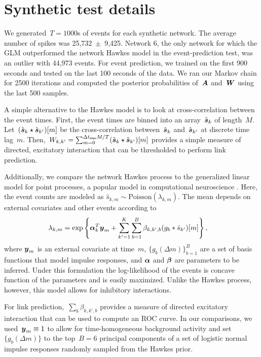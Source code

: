 \section{Synthetic test details}
We generated~${T=1000}$s of events for each synthetic network. The average number of spikes was 25,732~$\pm$~9,425. Network 6, the only network for which the GLM outperformed the network Hawkes model in the event-prediction test,  was an outlier with 44,973 events. For event prediction, we trained on the first 900 seconds and tested on the last 100 seconds of the data. We ran our Markov chain for 2500 iterations and computed the posterior probabilities of~$\boldsymbol{A}$ and~$\boldsymbol{W}$ using the last 500 samples. 

A simple alternative to the Hawkes model is to look at cross-correlation between the event times. First, the event times are binned into an array~$\hat{\boldsymbol{s}}_k$ of length~$M$. Let~${(\hat{\boldsymbol{s}}_k \star \hat{\boldsymbol{s}}_{k'})[m]}$ be the cross-correlation between~$\hat{\boldsymbol{s}}_k$ and~$\hat{\boldsymbol{s}}_{k'}$ at discrete time lag~$m$. Then,~${W_{k,k'}=\sum_{m=0}^{\Delta t_{\mathsf{max}}M/T}(\hat{\boldsymbol{s}}_k \star \hat{\boldsymbol{s}}_{k'})[m]}$ provides a simple measure of directed, excitatory interaction that can be thresholded to perform link prediction.

Additionally, we compare the network Hawkes process to the generalized linear model for point processes, a popular model in computational neuroscience \cite{Paninski-2004}. Here, the event counts are modeled as ${\hat{s}_{k,m}\sim\text{Poisson}(\lambda_{k,m})}$. The mean depends on external covariates and other events according to
\begin{align*}
  \lambda_{k,m} &= \exp\left\{ \boldsymbol{\alpha}_k^T\boldsymbol{y}_m + \sum_{k'=1}^K\sum_{b=1}^B \beta_{k,k',b} (g_{b}\ast \hat{s}_{k'})[m ]\right\},
\end{align*}
where $\boldsymbol{y}_m$ is an external covariate at time~$m$, $\{g_b(\Delta m)\}_{b=1}^B$ are a set of basis functions that model impulse responses, and $\boldsymbol{\alpha}$ and $\boldsymbol{\beta}$ are parameters to be inferred. Under this formulation the log-likelihood of the events is concave function of the parameters and is easily maximized. Unlike the Hawkes process, however, this model allows for inhibitory interactions. 

For link prediction,~${\sum_b \beta_{k,k',b}}$ provides a measure of directed excitatory interaction that can be used to compute an ROC curve. In our comparisons, we used~${\boldsymbol{y}_m\equiv 1}$ to allow for time-homogeneous background activity and set~${\{g_b(\Delta m)\}}$ to the top~${B=6}$ principal components of a set of logistic normal impulse responses randomly sampled from the Hawkes prior. 


